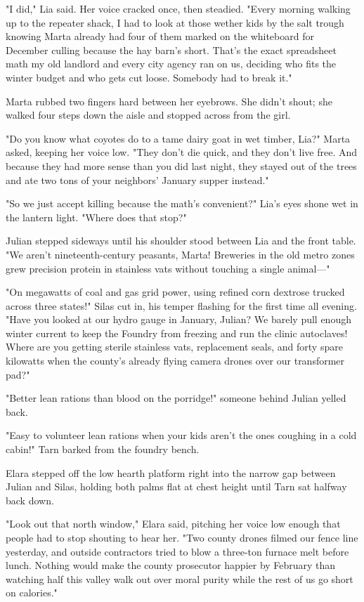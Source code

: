 "I did," Lia said. Her voice cracked once, then steadied. "Every morning walking up to the repeater shack, I had to look at those wether kids by the salt trough knowing Marta already had four of them marked on the whiteboard for December culling because the hay barn's short. That's the exact spreadsheet math my old landlord and every city agency ran on us, deciding who fits the winter budget and who gets cut loose. Somebody had to break it."

Marta rubbed two fingers hard between her eyebrows. She didn't shout; she walked four steps down the aisle and stopped across from the girl.

"Do you know what coyotes do to a tame dairy goat in wet timber, Lia?" Marta asked, keeping her voice low. "They don't die quick, and they don't live free. And because they had more sense than you did last night, they stayed out of the trees and ate two tons of your neighbors' January supper instead."

"So we just accept killing because the math's convenient?" Lia's eyes shone wet in the lantern light. "Where does that stop?"

Julian stepped sideways until his shoulder stood between Lia and the front table. "We aren't nineteenth-century peasants, Marta! Breweries in the old metro zones grew precision protein in stainless vats without touching a single animal—"

"On megawatts of coal and gas grid power, using refined corn dextrose trucked across three states!" Silas cut in, his temper flashing for the first time all evening. "Have you looked at our hydro gauge in January, Julian? We barely pull enough winter current to keep the Foundry from freezing and run the clinic autoclaves! Where are you getting sterile stainless vats, replacement seals, and forty spare kilowatts when the county's already flying camera drones over our transformer pad?"

"Better lean rations than blood on the porridge!" someone behind Julian yelled back.

"Easy to volunteer lean rations when your kids aren't the ones coughing in a cold cabin!" Tarn barked from the foundry bench.

Elara stepped off the low hearth platform right into the narrow gap between Julian and Silas, holding both palms flat at chest height until Tarn sat halfway back down.

"Look out that north window," Elara said, pitching her voice low enough that people had to stop shouting to hear her. "Two county drones filmed our fence line yesterday, and outside contractors tried to blow a three-ton furnace melt before lunch. Nothing would make the county prosecutor happier by February than watching half this valley walk out over moral purity while the rest of us go short on calories."

